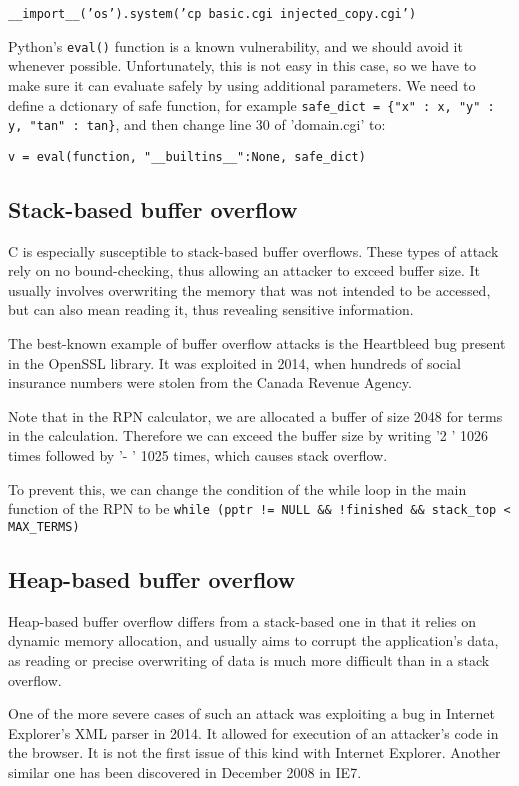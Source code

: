 \documentclass[11pt,journal]{article}
\begin{document}
	\texttt{\_\_import\_\_('os').system('cp basic.cgi injected\_copy.cgi')}
	
	Python's \texttt{eval()} function is a known vulnerability, and we should avoid it whenever possible. Unfortunately, this is not easy in this case, so we have to make sure it can evaluate safely by using additional parameters. We need to define a dctionary of safe function, for example \texttt{safe\_dict = \{"x" : x, "y" : y, "tan" : tan\}}, and then change line 30 of 'domain.cgi' to:
	
	\texttt{v = eval(function, "\_\_builtins\_\_":None, safe\_dict)}
	
	\subsection{Stack-based buffer overflow}
	C is especially susceptible to stack-based buffer overflows. These types of attack rely on no bound-checking, thus allowing an attacker to exceed buffer size. It usually involves overwriting the memory that was not intended to be accessed, but can also mean reading it, thus revealing sensitive information.
	
	The best-known example of buffer overflow attacks is the Heartbleed bug present in the OpenSSL library. It was exploited in 2014, when hundreds of social insurance numbers were stolen from the Canada Revenue Agency\cite{heartbleed news}.
	
	Note that in the RPN calculator, we are allocated a buffer of size 2048 for terms in the calculation. Therefore we can exceed the buffer size by writing '2 ' 1026 times followed by '- ' 1025 times, which causes stack overflow.
	
	To prevent this, we can change the condition of the while loop in the main function of the RPN to be \texttt{while (pptr != NULL \&\& !finished \&\& stack\_top < MAX\_TERMS) }
	
	\subsection{Heap-based buffer overflow}
	Heap-based buffer overflow differs from a stack-based one in that it relies on dynamic memory allocation, and usually aims to corrupt the application's data, as reading or precise overwriting of data is much more difficult than in a stack overflow. 
	
	One of the more severe cases of such an attack was exploiting a bug in Internet Explorer's XML parser in 2014. It allowed for execution of an attacker's code in the browser. It is not the first issue of this kind with Internet Explorer. Another similar one has been discovered in December 2008 in IE7\cite{IE2}.
	
\end{document}
